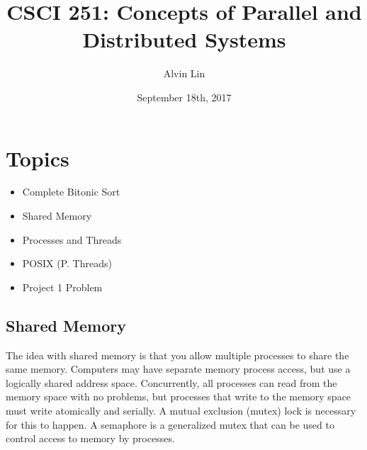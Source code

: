 \documentclass[letterpaper, 12pt]{math}
\title{CSCI 251: Concepts of Parallel and Distributed Systems}
\author{Alvin Lin}
\date{September 18th, 2017}
\begin{document}
\maketitle

\section*{Topics}
\begin{itemize}
  \item Complete Bitonic Sort
  \item Shared Memory
  \item Processes and Threads
  \item POSIX (P. Threads)
  \item Project 1 Problem
\end{itemize}

\subsection*{Shared Memory}
The idea with shared memory is that you allow multiple processes to share the
same memory. Computers may have separate memory process access, but use
a logically shared address space. Concurrently, all processes can read from the
memory space with no problems, but processes that write to the memory space must
write atomically and serially. A mutual exclusion (mutex) lock is necessary for
this to happen. A semaphore is a generalized mutex that can be used to control
access to memory by processes.
\end{document}
